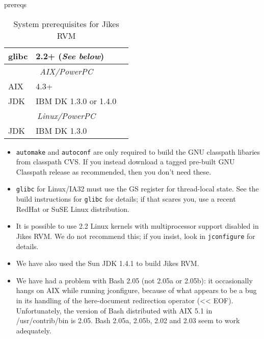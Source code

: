 \begin{Label}{prereqs}
\begin{table}[h]
\begin{center}
\begin{tabular}{|l|l|l|}
glibc          & 2.2+ ({\em See below}) & \xlink{\tt \glibcURL}{\glibcURL} \\ \hline
\multicolumn{3}{|c|}{\em AIX/PowerPC}                     \\ \hline
AIX            & 4.3+     &                          \\
JDK            & IBM DK 1.3.0 or 1.4.0 & \xlink{\tt \AIXJdkURL}{\AIXJdkURL} \\ \hline
\multicolumn{3}{|c|}{\em Linux/PowerPC}                      \\ \hline
JDK            & IBM DK 1.3.0    & \xlink{\tt \linuxPPCJDKURL}{\linuxPPCJDKURL} \\
\hline\hline 
\end{tabular}
\end{center}
\caption{System prerequisites for Jikes RVM}
\end{table}
\end{Label}

\begin{itemize}
\item {\tt automake} and {\tt autoconf} are only required to build the
GNU classpath libaries from classpath CVS. If you instead download a
tagged pre-built GNU Classpath release as recommended, then you don't need
these.
\item {\tt glibc} for Linux/IA32 must use the GS register for
thread-local state.  See the build instructions for {\tt glibc} for details;
if that scares you, use a recent RedHat or SuSE Linux distribution.

\item It is possible to use 2.2 Linux kernels with multiprocessor
support disabled in Jikes RVM.  We do not recommend this; if you
insist, look in {\tt jconfigure} for details.
\item We have also used the Sun JDK 1.4.1 to build Jikes RVM.

\item We have had a problem with Bash 2.05 (not
  2.05a or 2.05b): it occasionally hangs on AIX while running
  jconfigure, because of what appears to be a bug in its handling of
  the here-document redirection operator (<< EOF).  Unfortunately, the
  version of Bash distributed with AIX 5.1 in /usr/contrib/bin is
  2.05.   Bash 2.05a, 2.05b, 2.02 and 2.03 seem to work adequately.

\end{itemize}

\AIXPPCJikesTMFooter

\JavaTMFooter

